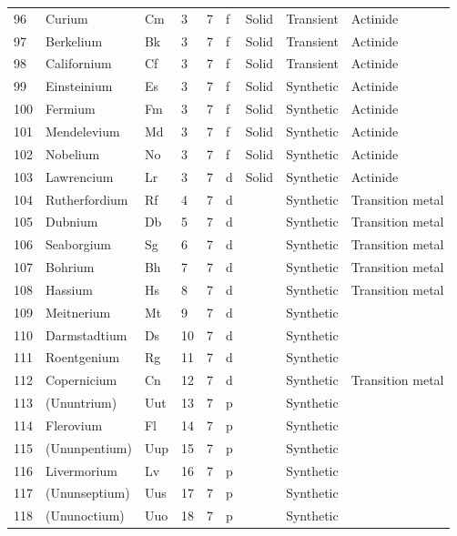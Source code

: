 \documentclass{article}
\begin{document}
\begin{tabular}{lllllllll}
96 & Curium & Cm & 3 & 7 & f & Solid & Transient & Actinide \\
97 & Berkelium & Bk & 3 & 7 & f & Solid & Transient & Actinide \\
98 & Californium & Cf & 3 & 7 & f & Solid & Transient & Actinide \\
99 & Einsteinium & Es & 3 & 7 & f & Solid & Synthetic & Actinide \\
100 & Fermium & Fm & 3 & 7 & f & Solid & Synthetic & Actinide \\
101 & Mendelevium & Md & 3 & 7 & f & Solid & Synthetic & Actinide \\
102 & Nobelium & No & 3 & 7 & f & Solid & Synthetic & Actinide \\
103 & Lawrencium & Lr & 3 & 7 & d & Solid & Synthetic & Actinide \\
104 & Rutherfordium & Rf & 4 & 7 & d &  & Synthetic & Transition metal \\
105 & Dubnium & Db & 5 & 7 & d &  & Synthetic & Transition metal \\
106 & Seaborgium & Sg & 6 & 7 & d &  & Synthetic & Transition metal \\
107 & Bohrium & Bh & 7 & 7 & d &  & Synthetic & Transition metal \\
108 & Hassium & Hs & 8 & 7 & d &  & Synthetic & Transition metal \\
109 & Meitnerium & Mt & 9 & 7 & d &  & Synthetic &  \\
110 & Darmstadtium & Ds & 10 & 7 & d &  & Synthetic &  \\
111 & Roentgenium & Rg & 11 & 7 & d &  & Synthetic &  \\
112 & Copernicium & Cn & 12 & 7 & d &  & Synthetic & Transition metal \\
113 & (Ununtrium) & Uut & 13 & 7 & p &  & Synthetic &  \\
114 & Flerovium & Fl & 14 & 7 & p &  & Synthetic &  \\
115 & (Ununpentium) & Uup & 15 & 7 & p &  & Synthetic &  \\
116 & Livermorium & Lv & 16 & 7 & p &  & Synthetic &  \\
117 & (Ununseptium) & Uus & 17 & 7 & p &  & Synthetic &  \\
118 & (Ununoctium) & Uuo & 18 & 7 & p &  & Synthetic &  \\
\bottomrule
\end{tabular}
\end{document}
